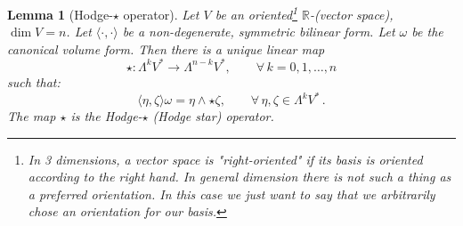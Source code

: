 \documentclass[a4paper,11pt,titlepage, article, oneside]{memoir}
\numberwithin{equation}{section}
\newtheorem{lemma}[theorem]{Lemma}
\theoremstyle{definition}
\theoremstyle{remark}
\newcommand{\rfield}{\mathbb{R}}
\begin{document}
\begin{lemma}[Hodge-$\star$ operator]
Let $V$ be an oriented\footnote{In 3 dimensions, a vector space is "right-oriented" if its basis is oriented according to the right hand. In general dimension there is not such a thing as a preferred orientation. In this case we just want to say that we arbitrarily chose an orientation for our basis.} $\rfield$-(vector space), $\dim V =n$. Let $\langle \cdot, \cdot \rangle$ be a non-degenerate, symmetric bilinear form. Let $\omega$ be the canonical volume form. Then there is a unique linear map
\begin{equation}
\star \colon \Lambda^k V^* \rightarrow \Lambda^{n-k}V^* , \qquad \forall\, k=0, 1, \ldots, n
\end{equation}
such that:
$$\langle \eta, \zeta \rangle \omega = \eta \wedge \star \zeta, \qquad \forall \, \eta, \zeta \in \Lambda^k V^* \, .$$
The map $\star$ is the Hodge-$\star$ (Hodge star) operator.
\end{lemma}
\end{document}
